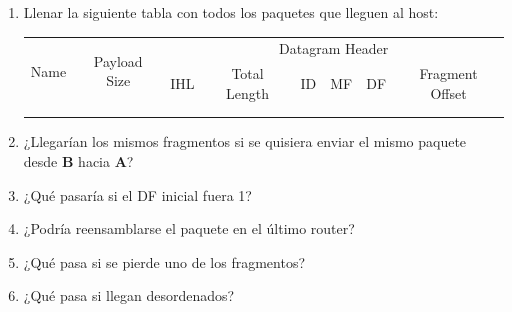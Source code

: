 \begin{enumerate}
    \item Llenar la siguiente tabla con todos los paquetes que lleguen al host:

    \begin{table}[H]
    \centering
    \renewcommand{\arraystretch}{1.5}
    \begin{tabular}{|c|c|crrrrr|}
    \hline
    \multirow{2}{*}{Name} & \multirow{2}{*}{Payload Size} & \multicolumn{6}{c|}{Datagram Header} \\ \cline{3-8} 
     &  & \multicolumn{1}{c|}{IHL} & \multicolumn{1}{c|}{Total Length} & \multicolumn{1}{c|}{ID} & \multicolumn{1}{c|}{MF} & \multicolumn{1}{c|}{DF} & \multicolumn{1}{c|}{Fragment Offset} \\ \hline
    \multicolumn{1}{|r|}{} & \multicolumn{1}{r|}{} & \multicolumn{1}{r|}{} & \multicolumn{1}{r|}{} & \multicolumn{1}{r|}{} & \multicolumn{1}{r|}{} & \multicolumn{1}{r|}{} &  \\ \hline
    \multicolumn{1}{|r|}{} & \multicolumn{1}{r|}{} & \multicolumn{1}{r|}{} & \multicolumn{1}{r|}{} & \multicolumn{1}{r|}{} & \multicolumn{1}{r|}{} & \multicolumn{1}{r|}{} &  \\ \hline
    \end{tabular}
    \end{table}

    \item ¿Llegarían los mismos fragmentos si se quisiera enviar el mismo paquete desde \textbf{B} hacia \textbf{A}?
    
    \item ¿Qué pasaría si el DF inicial fuera 1?
    
    \item ¿Podría reensamblarse el paquete en el último router?
    
    \item ¿Qué pasa si se pierde uno de los fragmentos?
    
    \item ¿Qué pasa si llegan desordenados?
\end{enumerate}
